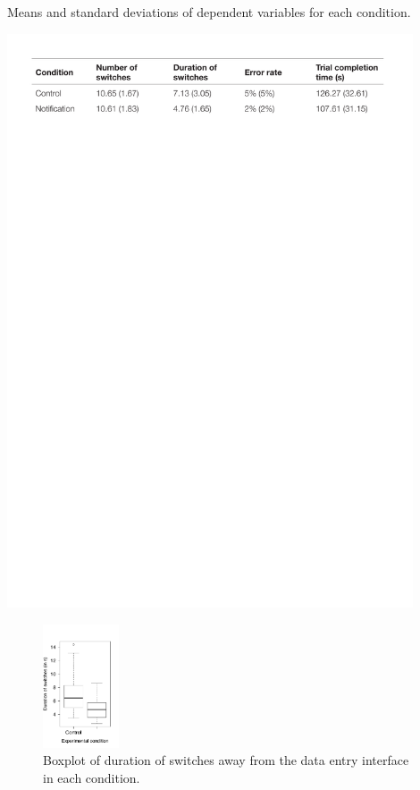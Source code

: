 \begin{table}
\caption{Means and standard deviations of dependent variables for each condition.}
\centering
\includegraphics[width=0.9\textwidth]{images/ch56/ch56-descstats.pdf}
\vspace{-3pt}
\label{tbl:ch56-Table1}
\end{table}

\begin{figure}
\centering
\includegraphics[width=0.2\textwidth]{images/ch56/ch56-boxplot.pdf}
\caption{Boxplot of duration of switches away from the data entry interface in each condition.}
\label{fig:ch56-Figure2}
\end{figure}

